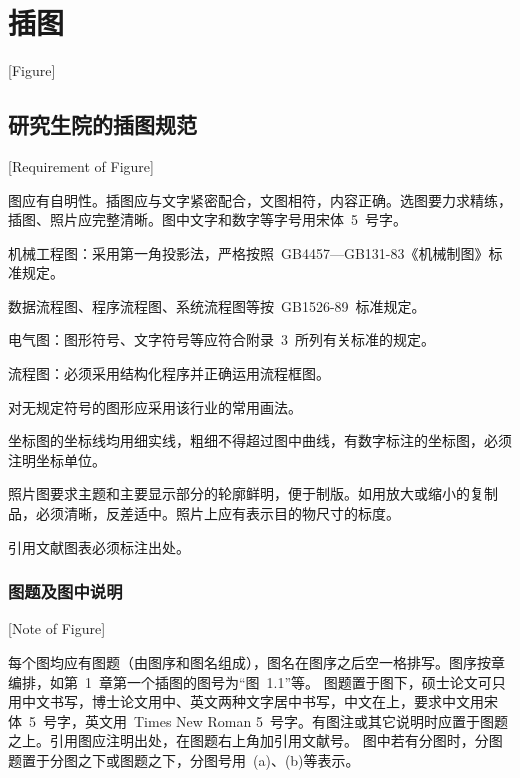 
%
%
%

\chapter{插图}[Figure]
\label{chap05}

\section{研究生院的插图规范}[Requirement of Figure]

图应有自明性。插图应与文字紧密配合，文图相符，内容正确。选图要力求精练，插图、照片应完整清晰。图中文字和数字等字号用宋体~5~号字。

机械工程图：采用第一角投影法，严格按照~GB4457---GB131-83《机械制图》标准规定。

数据流程图、程序流程图、系统流程图等按~GB1526-89~标准规定。

电气图：图形符号、文字符号等应符合附录~3~所列有关标准的规定。

流程图：必须采用结构化程序并正确运用流程框图。

对无规定符号的图形应采用该行业的常用画法。

坐标图的坐标线均用细实线，粗细不得超过图中曲线，有数字标注的坐标图，必须注明坐标单位。

照片图要求主题和主要显示部分的轮廓鲜明，便于制版。如用放大或缩小的复制品，必须清晰，反差适中。照片上应有表示目的物尺寸的标度。

引用文献图表必须标注出处。


\subsection{图题及图中说明}[Note of Figure]

每个图均应有图题（由图序和图名组成），图名在图序之后空一格排写。图序按章编排，如第~1~章第一个插图的图号为“图~1.1”等。
图题置于图下，硕士论文可只用中文书写，博士论文用中、英文两种文字居中书写，中文在上，要求中文用宋体~5~号字，英文用~Times New Roman 5~号字。有图注或其它说明时应置于图题之上。引用图应注明出处，在图题右上角加引用文献号。
图中若有分图时，分图题置于分图之下或图题之下，分图号用~(a)、(b)等表示。

